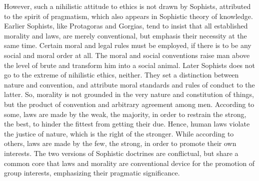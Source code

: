 \documentclass[11pt]{article}
\begin{document}
However, such a nihilistic attitude to ethics is not drawn by Sophists, attributed to the spirit of pragmatism, which also appears in Sophistic theory of knowledge. 
Earlier Sophists, like Protagoras and Gorgias, tend to insist that all established morality and laws, are merely conventional, but emphasis their necessity at the same time. 
Certain moral and legal rules must be employed, if there is to be any social and moral order at all. 
The moral and social conventions raise man above the level of brute and transform him into a social animal. 
Later Sophists does not go to the extreme of nihilistic ethics, neither. 
They set a distinction between nature and convention, and attribute moral standards and rules of conduct to the latter. 
So, morality is not grounded in the very nature and constitution of things, but the product of convention and arbitrary agreement among men. 
According to some, laws are made by the weak, the majority, in order to restrain the strong, the best, to hinder the fittest from getting their due. 
Hence, human laws violate the justice of nature, which is the right of the stronger. 
While according to others, laws are made by the few, the strong, in order to promote their own interests. 
The two versions of Sophistic doctrines are conflictual, but share a common core that laws and morality are conventional device for the promotion of group interests, emphasizing their pragmatic significance.
\end{document}
